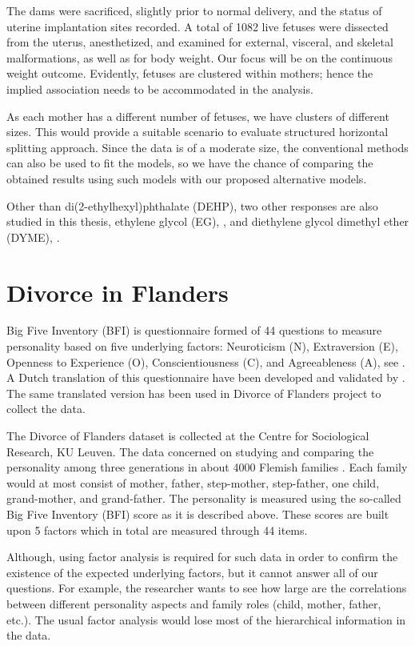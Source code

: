 \documentclass[11pt,a5paper,twoside]{book}
\begin{document}
The dams were sacrificed, slightly prior to normal delivery, and the status of uterine implantation sites recorded. A total of 1082 live fetuses were dissected from the uterus, anesthetized, and examined for external, visceral, and skeletal malformations, as well as for body
weight. Our focus will be on the continuous weight outcome. Evidently, fetuses are clustered within mothers; hence the implied association needs to be accommodated in the analysis. 

As each mother has a different number of fetuses, we have clusters of different sizes. This would provide a suitable scenario to evaluate structured horizontal splitting approach. Since the data is of a moderate size, the conventional methods can also be used to fit the models, so we have the chance of comparing the obtained results using such models with our proposed alternative models.

Other than di(2-ethylhexyl)phthalate (DEHP), two other responses are also studied in this thesis, ethylene glycol (EG), \cite{price1987}, and diethylene glycol dimethyl ether (DYME), \cite{price1985}.

\section{Divorce in Flanders} 

Big Five Inventory (BFI) is questionnaire formed of 44 questions to measure personality based on five underlying factors: Neuroticism (N), Extraversion (E), Openness to Experience (O), Conscientiousness (C), and Agreeableness (A), see \cite{john1999}. A Dutch translation of this questionnaire have been developed and validated by \cite{denissen2008}. The same translated version has been used in Divorce of Flanders project to collect the data.  

The Divorce of Flanders dataset is collected at the Centre for Sociological Research, KU Leuven. The data concerned on studying and comparing the personality among
three generations in about 4000 Flemish families \citep{mortelmans2011}. Each family would at most consist of mother, father, step-mother, step-father, one child, grand-mother, and grand-father.  The personality is measured using the so-called Big Five Inventory (BFI) score as it is described above. These scores are built upon 5 factors which in total are measured through 44 items. 

Although, using factor analysis is required for such data in order to confirm the existence of the expected underlying factors, but it cannot answer all of our questions. For example, the researcher wants to see how large are the correlations between different personality aspects and family roles (child, mother, father, etc.). The usual factor analysis would lose most of the hierarchical information in the data. 
\end{document}
